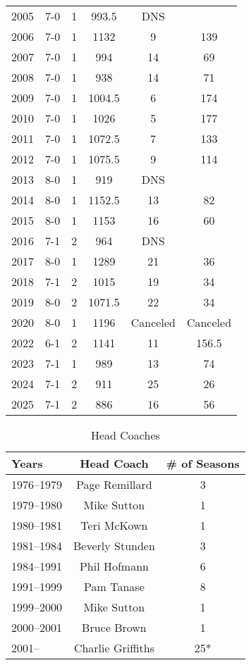 \begin{longtable}{lccccc}
2005 & 7-0 & 1 & 993.5 & DNS &  \\
2006 & 7-0 & 1 & 1132 & 9 & 139 \\
2007 & 7-0 & 1 & 994 & 14 & 69 \\
2008 & 7-0 & 1 & 938 & 14 & 71 \\
2009 & 7-0 & 1 & 1004.5 & 6 & 174 \\
2010 & 7-0 & 1 & 1026 & 5 & 177 \\
2011 & 7-0 & 1 & 1072.5 & 7 & 133 \\
2012 & 7-0 & 1 & 1075.5 & 9 & 114 \\
2013 & 8-0 & 1 & 919 & DNS &  \\
2014 & 8-0 & 1 & 1152.5 & 13 & 82 \\
2015 & 8-0 & 1 & 1153 & 16 & 60 \\
2016 & 7-1 & 2 & 964 & DNS &  \\
2017 & 8-0 & 1 & 1289 & 21 & 36 \\
2018 & 7-1 & 2 & 1015 & 19 & 34 \\
2019 & 8-0 & 2 & 1071.5 & 22 & 34 \\
2020 & 8-0 & 1 & 1196 & Canceled & Canceled \\
2022 & 6-1 & 2 & 1141 & 11 & 156.5 \\
2023 & 7-1 & 1 & 989 & 13 & 74 \\
2024 & 7-1 & 2 & 911 & 25 & 26 \\
2025 & 7-1 & 2 & 886 & 16 & 56 \\
\end{longtable}


\begin{table}[htbp]
\centering
\caption*{Head Coaches}
\begin{tabular}{lcc}
\toprule
Years & Head Coach & \# of Seasons \\
\midrule
1976--1979 & Page Remillard & 3 \\
1979--1980 & Mike Sutton & 1 \\
1980--1981 & Teri McKown & 1 \\
1981--1984 & Beverly Stunden & 3 \\
1984--1991 & Phil Hofmann & 6 \\
1991--1999 & Pam Tanase & 8 \\
1999--2000 & Mike Sutton & 1 \\
2000--2001 & Bruce Brown & 1 \\
2001-- & Charlie Griffiths & 25* \\
\bottomrule
\end{tabular}
\end{table}

